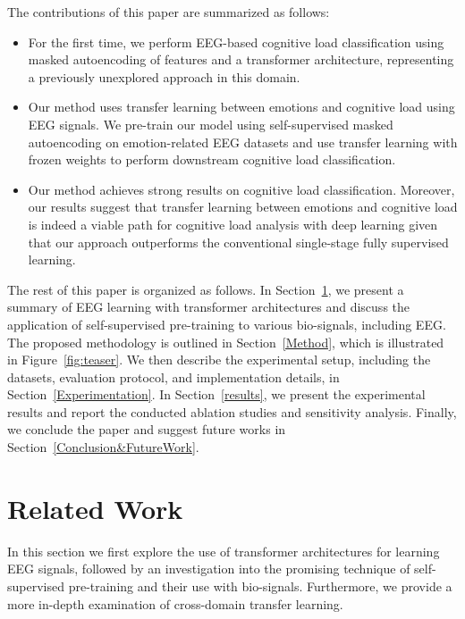 \documentclass[sigconf]{acmart}
\begin{document}
The contributions of this paper are summarized as follows:
\begin{itemize}

\item For the first time, we perform EEG-based cognitive load classification using masked autoencoding of features and a transformer architecture, representing a previously unexplored approach in this domain.

\item Our method uses transfer learning between emotions and cognitive load using EEG signals. We pre-train our model using self-supervised masked autoencoding on emotion-related EEG datasets and use transfer learning with frozen weights to perform downstream cognitive load classification.

\item Our method achieves strong results on cognitive load classification. Moreover, our results suggest that transfer learning between emotions and cognitive load is indeed a viable path for cognitive load analysis with deep learning given that our approach outperforms the conventional single-stage fully supervised learning.

\end{itemize}

The rest of this paper is organized as follows. In Section~\ref{Related Work}, we present a summary of EEG learning with transformer architectures and discuss the application of self-supervised pre-training to various bio-signals, including EEG. The proposed methodology is outlined in Section~\ref{Method}, which is illustrated in Figure~\ref{fig:teaser}. We then describe the experimental setup, including the datasets, evaluation protocol, and implementation details, in Section~\ref{Experimentation}. In Section~\ref{results}, we present the experimental results and report the conducted ablation studies and sensitivity analysis. Finally, we conclude the paper and suggest future works in Section~\ref{Conclusion&FutureWork}.

\section{Related Work} \label{Related Work}
In this section we first explore the use of transformer architectures for learning EEG signals, followed by an investigation into the promising technique of self-supervised pre-training and their use with bio-signals. Furthermore, we provide a more in-depth examination of cross-domain transfer learning.
\end{document}
